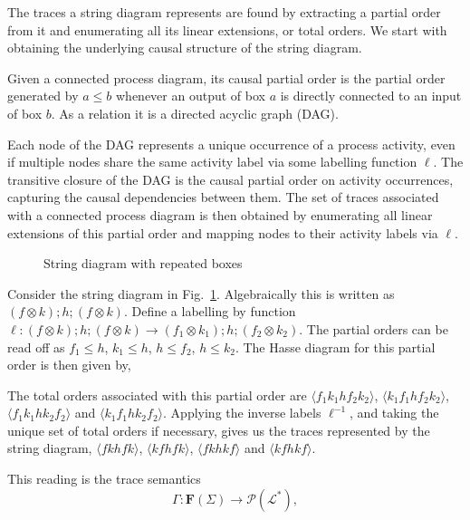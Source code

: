 The traces a string diagram represents are found by extracting a partial order from it and enumerating all its linear extensions, or total orders. We start with obtaining the underlying causal structure of the string diagram.
\begin{definition}\label{def:causal-partial-order}
Given a connected process diagram, its causal partial order is the partial order generated
by $a \le b$ whenever an output of box $a$ is directly connected to an input of box $b$.
As a relation it is a directed acyclic graph (DAG).
\end{definition}
Each node of the DAG represents a unique occurrence of a process activity, even if multiple nodes share the same activity label via some labelling function $\ell$. The transitive closure of the DAG is the causal partial order on activity occurrences, capturing the causal dependencies between them. The set of traces associated with a connected process diagram is then obtained by enumerating all linear extensions of this partial order and mapping nodes to their activity labels via $\ell$.
\begin{figure}[htbp]
\centering
\unskip
\caption{String diagram with repeated boxes}\label{fig:repeated-boxes}
\end{figure}
\begin{exmp}
Consider the string diagram in Fig.~\ref{fig:repeated-boxes}. Algebraically this is written as $(f\otimes{}k);h;(f\otimes{}k)$. Define a labelling by function $\ell:(f\otimes{}k);h;(f\otimes{}k)\to{}(f_1\otimes{}k_1);h;(f_2\otimes{}k_2)$. The partial orders can be read off as $f_1\le{}h$, $k_1\le{}h$, $h\le{}f_2$, $h\le{}k_2$. The Hasse diagram for this partial order is then given by,
\begin{center}
\unskip
\end{center}
The total orders associated with this partial order are $\langle f_1k_1hf_2k_2\rangle$, $\langle k_1f_1hf_2k_2\rangle$, $\langle f_1k_1hk_2f_2\rangle$ and $\langle k_1f_1hk_2f_2\rangle$. Applying the inverse labels $\ell^{-1}$, and taking the unique set of total orders if necessary, gives us the traces represented by the string diagram, $\langle fkhfk\rangle$, $\langle kfhfk\rangle$, $\langle fkhkf\rangle$ and $\langle kfhkf\rangle$.
\end{exmp}
This reading is the trace semantics
\[
\Gamma : \mathbf{F}(\Sigma) \to \mathcal{P}(\mathcal{L}^\ast),
\]
